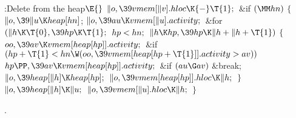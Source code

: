 \Y\B\4:Delete  from the heap\X${}\E{}$\6
$\|o,\39\\{vmem}[\|v].\\{hloc}\K{-}\T{1};{}$\6
\&{if} ${}(\MM\\{hn}){}$\5
${}\{{}$\1\6
${}\|o,\39\|u\K\\{heap}[\\{hn}]{}$;\6
${}\|o,\39\\{au}\K\\{vmem}[\|u].\\{activity};{}$\6
\&{for} ${}(\|h\K\T{0},\39\\{hp}\K\T{1};{}$ ${}\\{hp}<\\{hn};{}$ ${}\|h\K%
\\{hp},\39\\{hp}\K\|h+\|h+\T{1}){}$\5
${}\{{}$\1\6
${}\\{oo},\39\\{av}\K\\{vmem}[\\{heap}[\\{hp}]].\\{activity};{}$\6
\&{if} ${}(\\{hp}+\T{1}<\\{hn}\W(\\{oo},\39\\{vmem}[\\{heap}[\\{hp}+\T{1}]].%
\\{activity}>\\{av})){}$\1\5
${}\\{hp}\PP,\39\\{av}\K\\{vmem}[\\{heap}[\\{hp}]].\\{activity};{}$\2\6
\&{if} ${}(\\{au}\G\\{av}){}$\1\5
\&{break};\2\6
${}\|o,\39\\{heap}[\|h]\K\\{heap}[\\{hp}];{}$\6
${}\|o,\39\\{vmem}[\\{heap}[\\{hp}]].\\{hloc}\K\|h;{}$\6
\4${}\}{}$\2\6
${}\|o,\39\\{heap}[\|h]\K\|u;{}$\6
${}\|o,\39\\{vmem}[\|u].\\{hloc}\K\|h;{}$\6
\4${}\}{}$\2\par
{}.\fi

